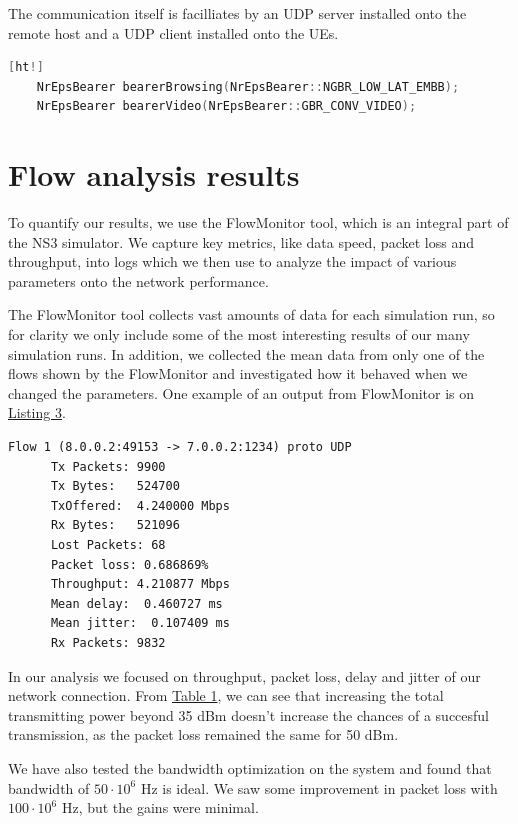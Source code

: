 \documentclass[10pt,a4]{article}
\begin{document}
    The communication itself is facilliates by an UDP server installed onto the remote host and a UDP client installed onto the UEs.
    \begin{lstlisting}[language=C++,caption=Traffic bearer definition.,label=lst:tfts][ht!]
    NrEpsBearer bearerBrowsing(NrEpsBearer::NGBR_LOW_LAT_EMBB);
    NrEpsBearer bearerVideo(NrEpsBearer::GBR_CONV_VIDEO);
    \end{lstlisting}
    \section{Flow analysis results}
    To quantify our results, we use the FlowMonitor tool, which is an integral part of the NS3 simulator. We capture key metrics, like data speed, packet loss and throughput, into logs which we then use to analyze the impact of various parameters onto the network performance.

    The FlowMonitor tool collects vast amounts of data for each simulation run, so for clarity we only include some of the most interesting results of our many simulation runs. In addition, we collected the mean data from only one of the flows shown by the FlowMonitor and investigated how it behaved when we changed the parameters. One example of an output from FlowMonitor is on \hyperref[lst:flow_ex]{Listing 3}.

    \begin{lstlisting}[caption=Example output from NS3 FlowMonitor,label=lst:flow_ex]
    Flow 1 (8.0.0.2:49153 -> 7.0.0.2:1234) proto UDP
      Tx Packets: 9900
      Tx Bytes:   524700
      TxOffered:  4.240000 Mbps
      Rx Bytes:   521096
      Lost Packets: 68
      Packet loss: 0.686869%
      Throughput: 4.210877 Mbps
      Mean delay:  0.460727 ms
      Mean jitter:  0.107409 ms
      Rx Packets: 9832
    \end{lstlisting}

    In our analysis we focused on throughput, packet loss, delay and jitter of our network connection. From \hyperref[tab:power]{Table 1}, we can see that increasing the total transmitting power beyond 35 dBm doesn't increase the chances of a succesful transmission, as the packet loss remained the same for 50 dBm.

    We have also tested the bandwidth optimization on the system and found that bandwidth of $50\cdot 10^6$ Hz is ideal. We saw some improvement in packet loss with $100\cdot 10^6$ Hz, but the gains were minimal.
\end{document}
